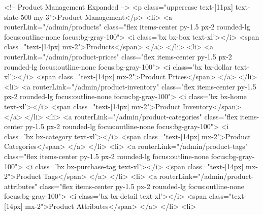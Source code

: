                     <!-- Product Management Expanded -->
                    <p class="uppercase text-[11px] text-slate-500 my-3">Product Management</p>
                    <li>
                        <a routerLink="/admin/products"
                            class="flex items-center py-1.5 px-2 rounded-lg focus:outline-none focus:bg-gray-100">
                            <i class='bx bx-box text-xl'></i>
                            <span class="text-[14px] mx-2">Products</span>
                        </a>
                    </li>
                    <li>
                        <a routerLink="/admin/product-prices"
                            class="flex items-center py-1.5 px-2 rounded-lg focus:outline-none focus:bg-gray-100">
                            <i class='bx bx-dollar text-xl'></i>
                            <span class="text-[14px] mx-2">Product Prices</span>
                        </a>
                    </li>
                    <li>
                        <a routerLink="/admin/product-inventory"
                            class="flex items-center py-1.5 px-2 rounded-lg focus:outline-none focus:bg-gray-100">
                            <i class='bx bx-home text-xl'></i>
                            <span class="text-[14px] mx-2">Product Inventory</span>
                        </a>
                    </li>
                    <li>
                        <a routerLink="/admin/product-categories"
                            class="flex items-center py-1.5 px-2 rounded-lg focus:outline-none focus:bg-gray-100">
                            <i class='bx bx-category text-xl'></i>
                            <span class="text-[14px] mx-2">Product Categories</span>
                        </a>
                    </li>
                    <li>
                        <a routerLink="/admin/product-tags"
                            class="flex items-center py-1.5 px-2 rounded-lg focus:outline-none focus:bg-gray-100">
                            <i class='bx bx-purchase-tag text-xl'></i>
                            <span class="text-[14px] mx-2">Product Tags</span>
                        </a>
                    </li>
                    <li>
                        <a routerLink="/admin/product-attributes"
                            class="flex items-center py-1.5 px-2 rounded-lg focus:outline-none focus:bg-gray-100">
                            <i class='bx bx-detail text-xl'></i>
                            <span class="text-[14px] mx-2">Product Attributes</span>
                        </a>
                    </li>
                    <li>
